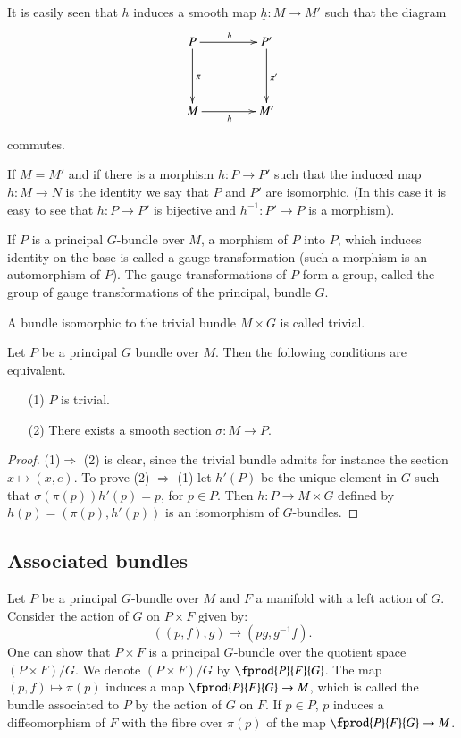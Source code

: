 It is easily seen that $h$ induces a smooth map $\underline{h}:M\to M'$ such that the diagram
\[
\xymatrix@=1.5cm{
P\ar[d]^{\pi}\ar[r]^{h} & P'\ar[d]^{\pi'}\\
M\ar[r]_{\underline{h}} & M'
}
\]
commutes.

If $M=M'$ and if there is a morphism $h:P\to P'$ such that the induced map $\underline{h}:M\to N$ is the identity we say that $P$ and $P'$ are isomorphic. (In this case it is easy to see that $h:P\to P'$ is bijective and $h^{-1}:P'\to P$ is a morphism).

If $P$ is a principal $G$-bundle over $M$, a morphism of $P$ into $P$, which induces identity on the base is called a gauge transformation (such a morphism is an automorphism of $P$). The gauge transformations of $P$ form a group, called the group of gauge transformations of the principal, bundle $G$.

A bundle isomorphic to the trivial bundle $M\times G$ is called trivial.

\begin{proposition}\label{sec10-prop10.1}
Let $P$ be a principal $G$ bundle over $M$. Then the following conditions are equivalent.
\begin{itemize}
\item[\rm(1)] $P$ is trivial.

\item[\rm(2)] There exists a smooth section $\sigma:M\to P$.
\end{itemize}
\end{proposition}

\begin{proof}
(1)\pageoriginale $\Rightarrow$ (2) is clear, since the trivial bundle admits for instance the section $x\mapsto (x,e)$. To prove (2) $\Rightarrow$ (1) let $h'(P)$ be the unique element in $G$ such that $\sigma(\pi(p))h'(p)=p$, for $p\in P$. Then $h:P\to M\times G$ defined by $h(p)=(\pi(p),h'(p))$ is an isomorphism of $G$-bundles.
\end{proof}

\subsection*{Associated bundles}

Let $P$ be a principal $G$-bundle over $M$ and $F$ a manifold with a left action of $G$. Consider the action of $G$ on $P\times F$ given by:
$$
((p,f),g)\mapsto (pg,g^{-1}f).
$$
One can show that $P\times F$ is a principal $G$-bundle over the quotient space $(P\times F)/G$. We denote $(P\times F)/G$ by $\fprod{P}{F}{G}$. The map $(p,f)\mapsto \pi(p)$ induces a map $\fprod{P}{F}{G}\to M$, which is called the bundle associated to $P$ by the action of $G$ on $F$. If $p\in P$, $p$ induces a diffeomorphism of $F$ with the fibre over $\pi(p)$ of the map $\fprod{P}{F}{G}\to M$.

